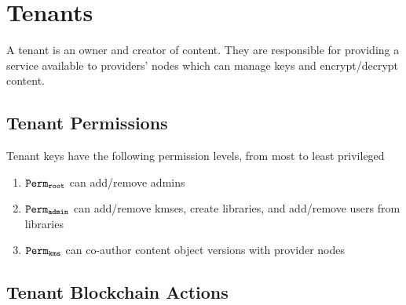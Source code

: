 \section{Tenants}

A tenant is an owner and creator of content. They are responsible for providing a service available to providers' nodes which can manage keys and encrypt/decrypt content.


\subsection{Tenant Permissions}
Tenant keys have the following permission levels, from most to least privileged

\begin{enumerate}
  \item $\mathtt{Perm_{root}}$ can add/remove admins
  \item $\mathtt{Perm_{admin}}$ can add/remove kmses, create libraries, and add/remove users from libraries
  \item $\mathtt{Perm_{kms}}$ can co-author content object versions with provider nodes
\end{enumerate}

\subsection{Tenant Blockchain Actions}

